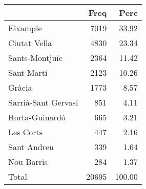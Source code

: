 
\begin{tabular}[t]{lrr}
\toprule
  & Freq & Perc\\
\midrule
Eixample & 7019 & 33.92\\
Ciutat Vella & 4830 & 23.34\\
Sants-Montjuïc & 2364 & 11.42\\
Sant Martí & 2123 & 10.26\\
Gràcia & 1773 & 8.57\\
\addlinespace
Sarrià-Sant Gervasi & 851 & 4.11\\
Horta-Guinardó & 665 & 3.21\\
Les Corts & 447 & 2.16\\
Sant Andreu & 339 & 1.64\\
Nou Barris & 284 & 1.37\\
\addlinespace
Total & 20695 & 100.00\\
\bottomrule
\end{tabular}